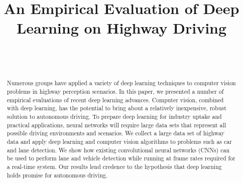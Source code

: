 \documentclass[journal]{IEEEtran}
\begin{document}
\title{An Empirical Evaluation of Deep Learning on Highway Driving}



\author{
 \\
~
~
~
 \\
}





















\maketitle


\begin{abstract}
\boldmath
Numerous groups have applied a variety of deep learning techniques to computer vision problems in highway perception scenarios. In this paper, we presented a number of empirical evaluations of recent deep learning advances. Computer vision, combined with deep learning, has the potential to bring about a relatively inexpensive, robust solution to autonomous driving. To prepare deep learning for industry uptake and practical applications, neural networks will require large data sets that represent all possible driving environments and scenarios. We collect a large data set of highway data and apply deep learning and computer vision algorithms to problems such as car and lane detection. We show how existing convolutional neural networks (CNNs) can be used to perform lane and vehicle detection while running at frame rates required for a real-time system. Our results lend credence to the hypothesis that deep learning holds promise for autonomous driving. 

\end{abstract}
\end{document}
